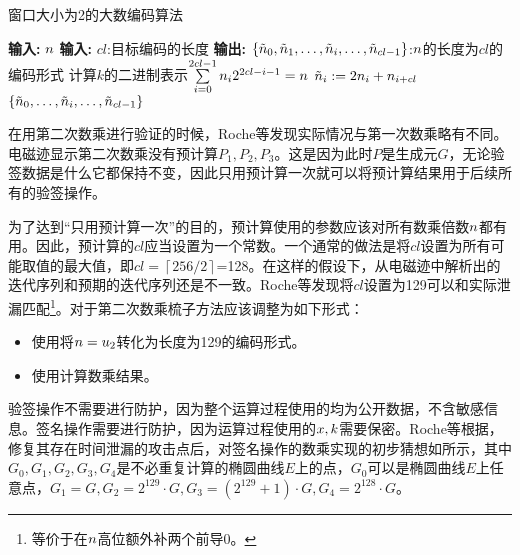 {	\begin{algorithm}
		\caption{窗口大小为2的大数编码算法}\label{alg:encodek}
		\begin{algorithmic}[1]
			\Statex \textbf{输入:} $n$
			\Statex \textbf{输入:} $cl$:目标编码的长度
			\Statex \textbf{输出:} $\left\{\tilde{n}_0,\tilde{n}_1,\dots,\tilde{n}_i,\dots, \tilde{n}_{cl-1}\right\}$:$n$的长度为$cl$的编码形式
			\State 计算$k$的二进制表示$\sum\limits_{i=0}^{2cl-1}n_i2^{2cl-i-1}=n$
			\State $\tilde {n}_i:=2n_i+n_{i+cl}$
			\EndFor
			\State \Return $\left\{\tilde{n}_0,\dots,\tilde{n}_i,\dots, \tilde{n}_{cl-1}\right\}$
		\end{algorithmic}
	\end{algorithm}
	
	在用第二次数乘进行验证的时候，Roche等\citep{Roche21}发现实际情况与第一次数乘略有不同。电磁迹显示第二次数乘没有预计算$P_1,P_2,P_3$。这是因为此时$P$是生成元$G$，无论验签数据是什么它都保持不变，因此只用预计算一次就可以将预计算结果用于后续所有的验签操作。
	
	为了达到“只用预计算一次”的目的，预计算使用的参数应该对所有数乘倍数$n$都有用。因此，预计算的$cl$应当设置为一个常数。一个通常的做法是将$cl$设置为所有可能取值的最大值，即$cl=\left\lceil256/2\right\rceil$=128。在这样的假设下，从电磁迹中解析出的迭代序列和预期的迭代序列还是不一致。Roche等\citep{Roche21}发现将$cl$设置为129可以和实际泄漏匹配\footnote{等价于在$n$高位额外补两个前导0。}。对于第二次数乘梳子方法应该调整为如下形式：
	
	\begin{itemize}
		\item 使用将$n=u_2$转化为长度为129的编码形式。
		\item 使用计算数乘结果。
	\end{itemize}
	
	验签操作不需要进行防护，因为整个运算过程使用的均为公开数据，不含敏感信息。签名操作需要进行防护，因为运算过程使用的$x,k$需要保密。Roche等\citep{Roche21}根据，修复其存在时间泄漏的攻击点后，对签名操作的数乘实现的初步猜想如所示，其中$G_0,G_1,G_2,G_3,G_4$是不必重复计算的椭圆曲线$E$上的点，$G_0$可以是椭圆曲线$E$上任意点，$G_1=G,G_2=2^{129}\cdot G,G_3=\left(2^{129}+1 \right) \cdot G,G_4=2^{128}\cdot G$。
	
}
